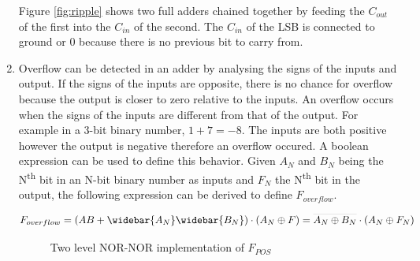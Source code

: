 \documentclass[CMPE]{KGCOEReport}
\def\lbar#1{\ThisStyle{%
  \setbox0=\hbox{$\SavedStyle#1$}%
  \stackengine{2.2\LMpt}{$\SavedStyle#1$}{\rule{\wd0}{0.1\LMpt}}{O}{c}{F}{F}{S}%
}}
\begin{document}
\begin{enumerate}
Figure \ref{fig:ripple} shows two full adders chained together by feeding the $C_{out}$ of the first into the $C_{in}$ of the second. The $C_{in}$ of the LSB is connected to ground or 0 because there is no previous bit to carry from.

  \item Overflow can be detected in an adder by analysing the signs of the inputs and output. If the signs of the inputs are opposite, there is no chance for overflow because the output is closer to zero relative to the inputs. An overflow occurs when the signs of the inputs are different from that of the output. For example in a 3-bit binary number, $1 + 7 = -8$. The inputs are both positive however the output is negative therefore an overflow occured. A boolean expression can be used to define this behavior. Given $A_N$ and $B_N$ being the N\textsuperscript{th} bit in an N-bit binary number as inputs and $F_N$ the N\textsuperscript{th} bit in the output, the following expression can be derived to define $F_{overflow}$.

\begin{equation}
\label{eq:overflow}
F_{overflow} = (AB + \widebar{A_N}\widebar{B_N}) \cdot (A_N \oplus F) = \lbar{A_N \oplus B_N} \cdot (A_N \oplus F_N)
\end{equation} 



\begin{figure}[htbp]
	\centering
	\caption{Two level NOR-NOR implementation of $F_{POS}$}
	\label{fig:nor-nor}
\end{figure}
\end{enumerate}
\end{document}
